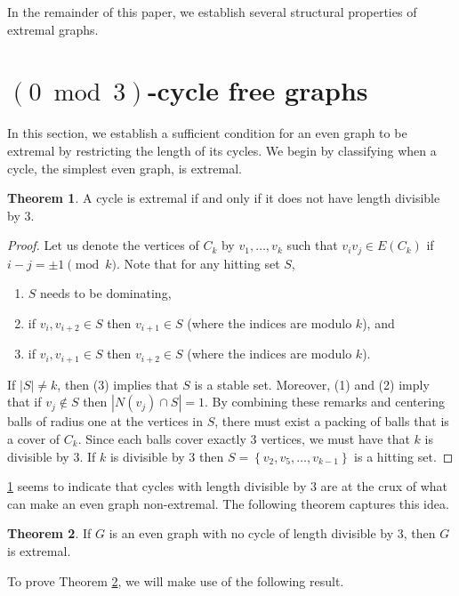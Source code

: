 \documentclass{amsart}
\theoremstyle{definition}
\newtheorem{theorem}{Theorem}[section]
\theoremstyle{remark}
\newcommand{\set}[1]{\left\{#1\right\}}
\begin{document}
In the remainder of this paper, we establish several structural properties of extremal graphs.

\section{$(0\bmod3)$-cycle free graphs}\label{sec-0cycle}

In this section, we establish a sufficient condition for an even graph to be extremal by restricting the length of its cycles. We begin by classifying when a cycle, the simplest even graph, is extremal.

\begin{theorem}\label{thm:cycles}
A cycle is extremal if and only if it does not have length divisible by $3$.
\end{theorem}
\begin{proof}
Let us denote the vertices of $C_k$ by $v_1,\dots,v_k$ such that $v_iv_j\in E(C_k)$ if $i-j = \pm 1 \pmod{k}$.
    Note that for any hitting set $S$,
    \begin{enumerate}
        \item $S$ needs to be dominating,
        \item if $v_i,v_{i+2} \in S$ then $v_{i+1}\in S$ (where the indices are modulo $k$), and
        \item if $v_i,v_{i+1} \in S$ then $v_{i+2}\in S$ (where the indices are modulo $k$).
    \end{enumerate}
If $|S|\neq k$, then (3) implies that $S$ is a stable set. Moreover, (1) and (2) imply that if $v_j\notin S$ then $|N(v_j)\cap S| =1$. By combining these remarks and centering balls of radius one at the vertices in $S$, there must exist a packing of balls that is a cover of $C_k$. Since each balls cover exactly $3$ vertices, we must have that $k$ is divisible by $3$. If $k$ is divisible by $3$ then $S=\set{v_2,v_5,\dots,v_{k-1}}$ is a hitting set.
\end{proof}

\cref{thm:cycles} seems to indicate that cycles with length divisible by $3$ are at the crux of what can make an even graph non-extremal. The following theorem captures this idea.

\begin{theorem}\label{thm:zm3c}
    If $G$ is an even graph with no cycle of length divisible by $3$, then $G$ is extremal.
\end{theorem}

To prove Theorem \ref{thm:zm3c}, we will make use of the following result.
\end{document}
